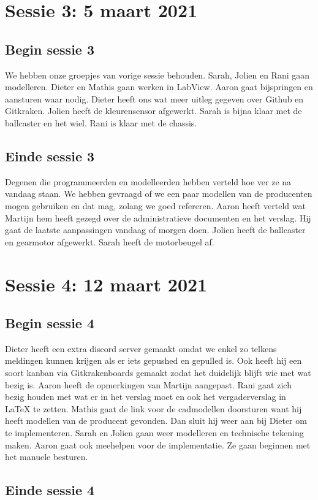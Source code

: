\documentclass[a4paper,twoside,kulak]{kulakreport} %
\begin{document}
\chapter{Sessie 3: 5 maart 2021}
\section{Begin sessie 3}
We hebben onze groepjes van vorige sessie behouden. Sarah, Jolien en Rani gaan modelleren. Dieter en Mathis gaan werken in LabView. Aaron gaat bijspringen en aansturen waar nodig. Dieter heeft ons wat meer uitleg gegeven over Github en Gitkraken. Jolien heeft de kleurensensor afgewerkt. Sarah is bijna klaar met de ballcaster en het wiel. Rani is klaar met de chassis.
\section{Einde sessie 3}
Degenen die programmeerden en modelleerden hebben verteld hoe ver ze na vandaag staan. We hebben gevraagd of we een paar modellen van de producenten mogen gebruiken en dat mag, zolang we goed refereren.  Aaron heeft verteld wat Martijn hem heeft gezegd over de administratieve documenten en het verslag. Hij gaat de laatste aanpassingen vandaag of morgen doen. Jolien heeft de ballcaster en gearmotor afgewerkt. Sarah heeft de motorbeugel af. 

\chapter{Sessie 4: 12 maart 2021}
\section{Begin sessie 4}
Dieter heeft een extra discord server gemaakt omdat we enkel zo telkens meldingen kunnen krijgen als er iets gepushed en gepulled is. Ook heeft hij een soort kanban via Gitkrakenboards gemaakt zodat het duidelijk blijft wie met wat bezig is. Aaron heeft de opmerkingen van Martijn aangepast. Rani gaat zich bezig houden met wat er in het verslag moet en ook het vergaderverslag in LaTeX te zetten. Mathis gaat de link voor de cadmodellen doorsturen want hij heeft modellen van de producent gevonden. Dan sluit hij weer aan bij Dieter om te implementeren. Sarah en Jolien gaan weer modelleren en technische tekening maken. Aaron gaat ook meehelpen voor de implementatie. Ze gaan beginnen met het manuele besturen. 
\section{Einde sessie 4}
\end{document}
